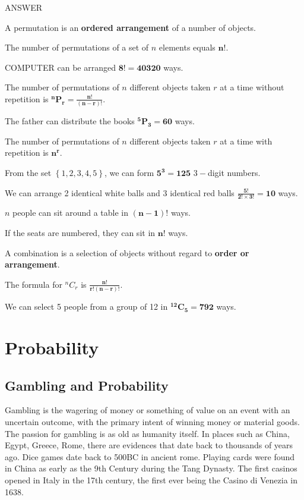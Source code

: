 \documentclass[11pt,a4paper]{book}
\begin{document}
\begin{testyourself}{ANSWER}
\begin{tasks}[label=(\alph*),label-width=3.5ex]

\task  A permutation is an \textbf{ordered arrangement} of a number of objects.

\task  The number of permutations of a set of $n$ elements equals
$\boldsymbol{n!}$.

\task  COMPUTER can be arranged $\boldsymbol{8!=40320}$ ways.

\task  The number of permutations of $n$ different objects taken
$r$ at a time without repetition\textbf{ }is $\boldsymbol{
^{n}P_{r}=\frac{n!}{\left(n-r\right)!}}$.

\task  The father can distribute the books $\boldsymbol{^{5}P_{3}=60}$ ways.

\task  The number of permutations of $n$ different objects taken
$r$ at a time with repetition\textbf{ }is $\boldsymbol{n^{r}}$.

\task  From the set $\left\{ 1,2,3,4,5\right\}$, we can form $\boldsymbol{5^{3}=125}$ $3-$digit numbers.

\task  We can arrange 2 identical white balls and 3 identical red balls $\boldsymbol{\frac{5!}{2!\times3!}=10}$ ways.

\task  $n$ people can sit around a table in $\boldsymbol{(n-1)!}$ ways.

\task  If the seats are numbered, they can sit in $\boldsymbol{n!}$ ways.

\task  A combination is a selection of objects without regard to
 \textbf{order or arrangement}.

\task  The formula for $^{n}C_{r}$ is $\boldsymbol{\frac{n!}{r!\left(n-r\right)!}}$.

\task We can select 5 people from a group of 12 in  $\boldsymbol{^{12}C_{5}=792}$ ways.

\end{tasks}
\end{testyourself}

\chapter{Probability}

\section{Gambling and Probability}

Gambling is the wagering of money or something of value on an event
with an uncertain outcome, with the primary intent of winning money
or material goods. The passion for gambling is as old as humanity
itself. In places such as China, Egypt, Greece, Rome, there are evidences that date back to thousands of years ago. Dice games date back to 500BC in ancient rome. Playing cards were found in China as early as the 9th Century during the Tang Dynasty. The first casinos opened in Italy in the 17th century, the first ever being the Casino di Venezia in 1638.
\end{document}
